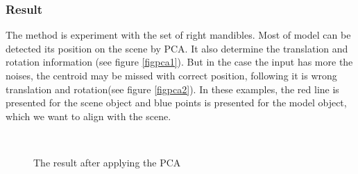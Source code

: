 \subsubsection{Result}
The method is experiment with the set of right mandibles. Most of model can be detected its position on the scene by PCA. It also determine the translation and rotation information (see figure \ref{figpca1}). But in the case the input has more the noises, the centroid may be missed with correct position, following it is wrong translation and rotation(see figure \ref{figpca2}). In these examples, the red line is presented for the scene object and blue points is presented for the model object, which we want to align with the scene.
\begin{figure}[h!]
\centering
{}~~
\caption{The result after applying the PCA}
\label{figpca}
\end{figure}
